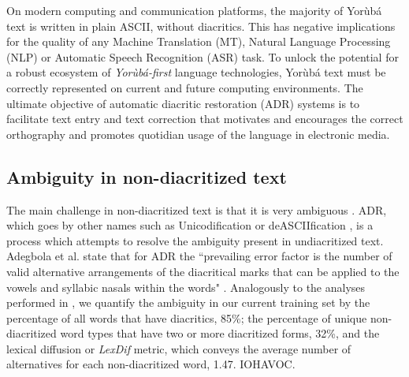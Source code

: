 \documentclass{article} %
\begin{document}
On modern computing and communication platforms, the majority of Yor{\`u}b{\'a} text is written in plain ASCII, without diacritics. This has negative implications for the quality of any Machine Translation (MT), Natural Language Processing (NLP) or Automatic Speech Recognition (ASR) task. To unlock the potential for a robust ecosystem of \emph{Yor{\`u}b{\'a}-first} language technologies, Yor{\`u}b{\'a} text must be correctly represented on current and future computing environments. The ultimate objective of automatic diacritic restoration (ADR) systems is to facilitate text entry and text correction that motivates and encourages the correct orthography and promotes quotidian usage of the language in electronic media.

\subsection{Ambiguity in non-diacritized text}
The main challenge in non-diacritized text is that it is very ambiguous \citep{orife2018adr, adegbola2012quantifying, asahiah2017restoring, de2007automatic}. ADR, which goes by other names such as Unicodification \citep{scannell2011statistical} or deASCIIfication \citep{arslan2016deasciification}, is a process which attempts to resolve the ambiguity present in undiacritized text. Adegbola et al. state that for ADR the ``prevailing error factor is the number of valid alternative arrangements of the diacritical marks that can be applied to the vowels and syllabic nasals within the words" \citep{adegbola2012quantifying}. Analogously to the analyses performed in \citep{orife2018adr}, we quantify the ambiguity in our current training set by the percentage of all words that have diacritics, 85\%; the percentage of unique non-diacritized word types that have two or more diacritized forms, 32\%, and the lexical diffusion or \emph{LexDif} metric, which conveys the average number of alternatives for each non-diacritized word, 1.47. IOHAVOC.
\end{document}
